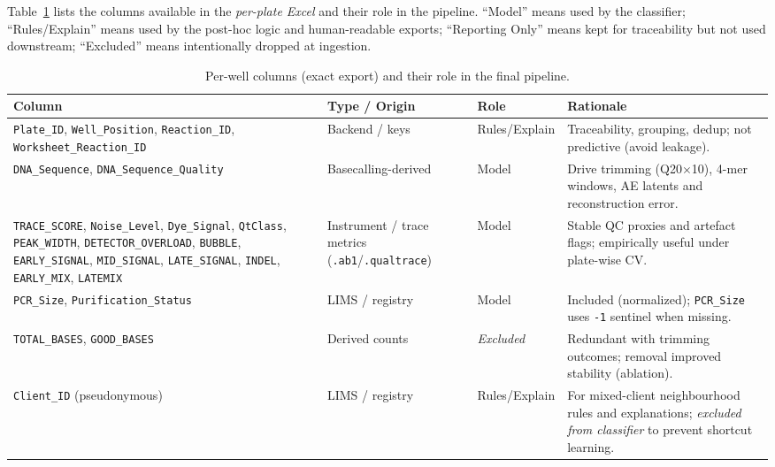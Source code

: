 Table~\ref{tab:schema_roles} lists the columns available in the \emph{per-plate Excel} and their role in the pipeline. ``Model'' means used by the classifier; ``Rules/Explain'' means used by the post-hoc logic and human-readable exports; ``Reporting Only'' means kept for traceability but not used downstream; ``Excluded'' means intentionally dropped at ingestion.

\begin{table}[H]
\centering
\caption{Per-well columns (exact export) and their role in the final pipeline.}
\label{tab:schema_roles}
\begin{tabular}{|p{4.0cm}|p{4.0cm}|p{3.1cm}|p{6.3cm}|}
\hline
\textbf{Column} & \textbf{Type / Origin} & \textbf{Role} & \textbf{Rationale} \\ \hline

\texttt{Plate\_ID}, \texttt{Well\_Position}, \texttt{Reaction\_ID}, \texttt{Worksheet\_Reaction\_ID}
& Backend / keys
& Rules/Explain
& Traceability, grouping, dedup; not predictive (avoid leakage). \\ \hline

\texttt{DNA\_Sequence}, \texttt{DNA\_Sequence\_Quality}
& Basecalling-derived
& Model
& Drive trimming (Q20$\times$10), 4-mer windows, AE latents and reconstruction error. \\ \hline

\texttt{TRACE\_SCORE}, \texttt{Noise\_Level}, \texttt{Dye\_Signal}, \texttt{QtClass}, \texttt{PEAK\_WIDTH}, \texttt{DETECTOR\_OVERLOAD}, \texttt{BUBBLE}, \texttt{EARLY\_SIGNAL}, \texttt{MID\_SIGNAL}, \texttt{LATE\_SIGNAL}, \texttt{INDEL}, \texttt{EARLY\_MIX}, \texttt{LATEMIX}
& Instrument / trace metrics (\texttt{.ab1}/\texttt{.qualtrace})
& Model
& Stable QC proxies and artefact flags; empirically useful under plate-wise CV. \\ \hline

\texttt{PCR\_Size}, \texttt{Purification\_Status}
& LIMS / registry
& Model
& Included (normalized); \texttt{PCR\_Size} uses \texttt{-1} sentinel when missing. \\ \hline

\texttt{TOTAL\_BASES}, \texttt{GOOD\_BASES}
& Derived counts
& \textit{Excluded}
& Redundant with trimming outcomes; removal improved stability (ablation). \\ \hline

\texttt{Client\_ID} (pseudonymous)
& LIMS / registry
& Rules/Explain
& For mixed-client neighbourhood rules and explanations; \emph{excluded from classifier} to prevent shortcut learning. \\ \hline


\end{tabular}
\end{table}
